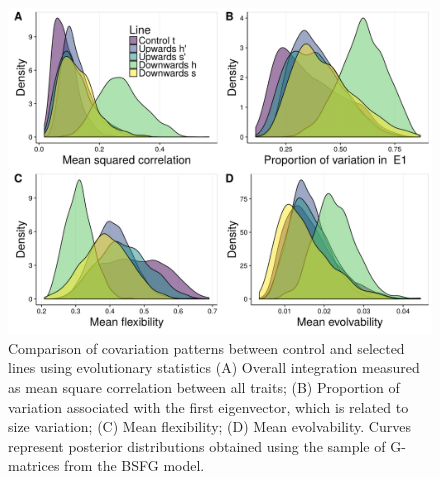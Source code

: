 \begin{refsection}
\begin{figure}
\centering
\includegraphics[width = 12cm]{chapter_ratones/media/SI/figureS9_Fig3Gversion.png}
\caption[G-matrix evolutionary statistics]{Comparison of covariation patterns between control and selected lines using evolutionary statistics (A) Overall integration measured as mean square correlation between all traits; (B) Proportion of variation associated with the first eigenvector, which is related to size variation; (C) Mean flexibility; (D) Mean evolvability. Curves represent posterior distributions obtained using the sample of G-matrices from the BSFG model.}
\end{figure}


\end{refsection}
